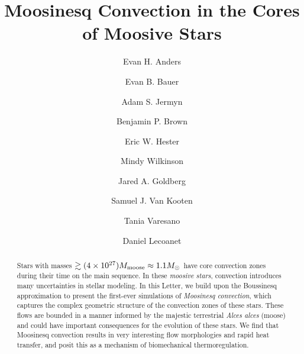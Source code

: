 \documentclass[onecolumn, twocolappendix]{aastex631}
\begin{document}
\title{Moosinesq Convection in the Cores of Moosive Stars}
\author[0000-0002-3433-4733]{Evan H. Anders}
\author[0000-0002-4791-6724]{Evan B. Bauer}
\author[0000-0001-5048-9973]{Adam S. Jermyn}
\author[0000-0001-8935-219X]{Benjamin P. Brown}
\author[0000-0003-1651-9141]{Eric W. Hester}
\author{Mindy Wilkinson}
\author[0000-0003-1012-3031]{Jared A. Goldberg}
\author[0000-0002-4472-8517]{Samuel J. Van Kooten}
\author[0000-0003-0256-9295]{Tania Varesano}
\author[0000-0002-7635-9728]{Daniel Lecoanet}


\begin{abstract}
    Stars with masses $\gtrsim (4 \times 10^{27})M_{\rm{moose}} \approx 1.1 M_\odot$ have core convection zones during their time on the main sequence.
    In these \emph{moosive stars}, convection introduces many uncertainties in stellar modeling.
    In this Letter, we build upon the Boussinesq approximation to present the first-ever simulations of \emph{Moosinesq convection}, which captures the complex geometric structure of the convection zones of these stars.
    These flows are bounded in a manner informed by the majestic terrestrial \emph{Alces alces} (moose) and could have important consequences for the evolution of these stars.
    We find that Moosinesq convection results in very interesting flow morphologies and rapid heat transfer, and posit this as a mechanism of biomechanical thermoregulation.
\end{abstract}
\end{document}
